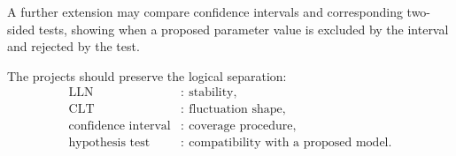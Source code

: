 A further extension may compare confidence intervals and corresponding two-sided tests, showing when a proposed parameter value is excluded by the interval and rejected by the test.

\begin{summarybox}
The projects should preserve the logical separation:
\[
\begin{aligned}
\text{LLN} &:\ \text{stability},\\
\text{CLT} &:\ \text{fluctuation shape},\\
\text{confidence interval} &:\ \text{coverage procedure},\\
\text{hypothesis test} &:\ \text{compatibility with a proposed model}.
\end{aligned}
\]
\end{summarybox}

